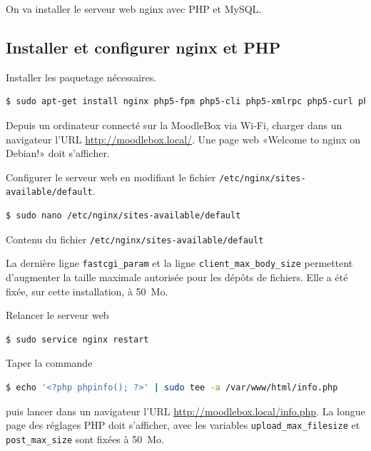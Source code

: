 \documentclass[11pt]{article}
\begin{document}
On va installer le serveur web nginx avec PHP et MySQL.

\subsection{Installer et configurer nginx et PHP}

Installer les paquetage nécessaires.

\begin{lstlisting}[language=bash]
$ sudo apt-get install nginx php5-fpm php5-cli php5-xmlrpc php5-curl php5-gd php5-intl
\end{lstlisting}

\begin{verification}
Depuis un ordinateur connecté sur la MoodleBox via Wi-Fi, charger dans un navigateur l'URL \url{http://moodlebox.local/}. Une page web «Welcome to nginx on Debian!» doit s'afficher.
\end{verification}

Configurer le serveur web en modifiant le fichier \lstinline{/etc/nginx/sites-available/default}.

\begin{lstlisting}[language=bash]
$ sudo nano /etc/nginx/sites-available/default
\end{lstlisting}

Contenu du fichier \lstinline{/etc/nginx/sites-available/default}



La dernière ligne \lstinline{fastcgi_param} et la ligne \lstinline{client_max_body_size} permettent d'augmenter la taille maximale autorisée pour les dépôts de fichiers. Elle a été fixée, sur cette installation, à 50~Mo.

Relancer le serveur web
\begin{lstlisting}[language=bash]
$ sudo service nginx restart
\end{lstlisting}

\begin{verification}
Taper la commande
\begin{lstlisting}[language=bash]
$ echo '<?php phpinfo(); ?>' | sudo tee -a /var/www/html/info.php
\end{lstlisting}
puis lancer dans un navigateur l'URL \url{http://moodlebox.local/info.php}. La longue page des réglages PHP doit s'afficher, avec les variables \lstinline{upload_max_filesize} et \lstinline{post_max_size} sont fixées à 50~Mo.
\end{verification}
\end{document}
